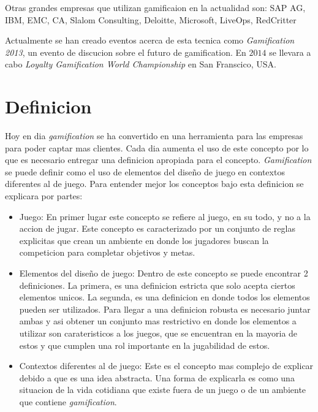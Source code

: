 Otras grandes empresas que utilizan gamificaion en la actualidad son: SAP AG, IBM, EMC, CA, Slalom Consulting,
 Deloitte, Microsoft, LiveOps, RedCritter\cite{Gam:Companies:1}  

Actualmente se han creado eventos acerca de esta tecnica como \emph{Gamification 2013}, un evento de discucion sobre
el futuro de gamification\cite{Gam:Events:1}. En $2014$ se llevara a cabo \emph{Loyalty Gamification World Championship} en San Franscico, USA.\cite{Gam:Events:2}

\section{Definicion}

Hoy en dia \emph{gamification} se ha convertido en una herramienta para las empresas 
para poder captar mas clientes. Cada dia aumenta el uso de este concepto por lo que es
necesario entregar una definicion apropiada para el concepto.  \emph{Gamification} se puede definir
como el uso de elementos del diseño de juego en contextos diferentes al de juego. Para entender mejor 
los conceptos bajo esta definicion se explicara por partes:

\begin{itemize}

\item Juego: En primer lugar este concepto se refiere al juego, en su todo, y no a la accion de jugar.
Este concepto es caracterizado por un conjunto de reglas explicitas que crean un ambiente  
en donde los jugadores buscan la competicion para completar objetivos y metas.

\item Elementos del diseño de juego: Dentro de este concepto se puede encontrar 2 definiciones.
La primera, es una definicion estricta que solo acepta ciertos elementos unicos. La segunda, 
es una definicion en donde todos los elementos pueden ser utilizados. Para llegar a una 
definicion robusta es necesario juntar ambas y asi obtener un conjunto mas restrictivo en donde 
los elementos a utilizar son carateristicos a los juegos, que se encuentran en la mayoria de estos y 
que cumplen una rol importante en la jugabilidad de estos.

\item Contextos diferentes al de juego: Este es el concepto mas complejo de explicar debido a que es una idea  
abstracta. Una forma de explicarla es como una situacion de la vida cotidiana que existe fuera 
de un juego o de un ambiente que contiene \emph{gamification}.

\end{itemize}

